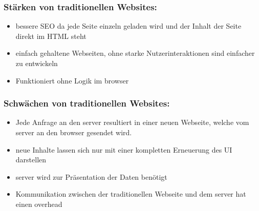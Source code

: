 \subsubsection*{Stärken von traditionellen Websites:}

\begin{itemize}
  \item bessere \ac{SEO} da jede Seite einzeln geladen wird und der Inhalt der Seite direkt im \ac{HTML} steht \cite{Smith2022} \cite{Irudayaraj2019}
  \item einfach gehaltene Webseiten, ohne starke Nutzerinteraktionen sind einfacher zu entwickeln \cite{Smith2022} \cite{Irudayaraj2019}
  \item Funktioniert ohne Logik im \gls{browser} \cite{Smith2022}
\end{itemize}

\subsubsection*{Schwächen von traditionellen Websites:}

\begin{itemize}
  \item Jede Anfrage an den \gls{server} resultiert in einer neuen Webseite, welche vom \gls{server} an den \gls{browser} gesendet wird. \cite{Flanagan2011} \cite{Robbins2018} \cite{Solovei2018}
  \item neue Inhalte lassen sich nur mit einer kompletten Erneuerung des \ac{UI} darstellen \cite{Flanagan2011} \cite{Robbins2018}
  \item \gls{server} wird zur Präsentation der Daten benötigt \cite{Flanagan2011} \cite{Robbins2018}
  \item Kommunikation zwischen der traditionellen Webseite und dem \gls{server} hat einen \gls{overhead} \cite{Flanagan2011}
\end{itemize}

